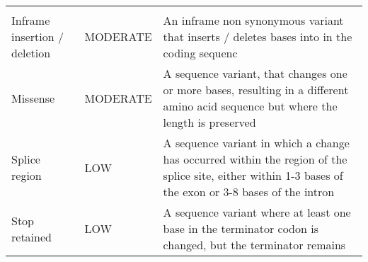 \documentclass[12pt,twoside]{reedthesis}
\theoremstyle{definition}
\theoremstyle{definition}
\theoremstyle{remark}
\begin{document}
\begin{longtable}[]{@{}lll@{}}
\begin{minipage}[t]{0.63\columnwidth}
  \end{minipage}\tabularnewline
  \begin{minipage}[t]{0.18\columnwidth}\raggedright\strut
  Inframe insertion / deletion\strut
  \end{minipage} & \begin{minipage}[t]{0.11\columnwidth}\raggedright\strut
  MODERATE\strut
  \end{minipage} & \begin{minipage}[t]{0.63\columnwidth}\raggedright\strut
  An inframe non synonymous variant that inserts / deletes bases into in
  the coding sequenc\strut
  \end{minipage}\tabularnewline
  \begin{minipage}[t]{0.18\columnwidth}\raggedright\strut
  Missense\strut
  \end{minipage} & \begin{minipage}[t]{0.11\columnwidth}\raggedright\strut
  MODERATE\strut
  \end{minipage} & \begin{minipage}[t]{0.63\columnwidth}\raggedright\strut
  A sequence variant, that changes one or more bases, resulting in a
  different amino acid sequence but where the length is preserved\strut
  \end{minipage}\tabularnewline
  \begin{minipage}[t]{0.18\columnwidth}\raggedright\strut
  Splice region\strut
  \end{minipage} & \begin{minipage}[t]{0.11\columnwidth}\raggedright\strut
  LOW\strut
  \end{minipage} & \begin{minipage}[t]{0.63\columnwidth}\raggedright\strut
  A sequence variant in which a change has occurred within the region of
  the splice site, either within 1-3 bases of the exon or 3-8 bases of the
  intron\strut
  \end{minipage}\tabularnewline
  \begin{minipage}[t]{0.18\columnwidth}\raggedright\strut
  Stop retained\strut
  \end{minipage} & \begin{minipage}[t]{0.11\columnwidth}\raggedright\strut
  LOW\strut
  \end{minipage} & \begin{minipage}[t]{0.63\columnwidth}\raggedright\strut
  A sequence variant where at least one base in the terminator codon is
  changed, but the terminator remains\strut
  \end{minipage}\tabularnewline

\end{longtable}
\end{document}
